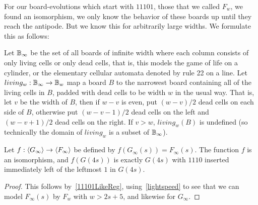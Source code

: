 \documentclass[12pt,letterpaper]{article}
\begin{document}
For our board-evolutions which start with $11101$, those that we called $F_w$, we found an isomorphism, we only know the behavior of these boards up until they reach the antipode. But we know this for arbitrarily large widths. We formulate this as follows:
\begin{dfn}\label{infiniteBoards}
  Let $\mathbb{B}_\infty$ be the set of all boards of infinite width where each column consists of only living cells or only dead cells, that is, this models the game of life on a cylinder, or the elementary cellular automata denoted by rule 22 on a line.
  Let $living_w: \mathbb{B}_\infty\rightarrow \mathbb{B}_w$ map a board $B$ to the narrowest board containing all of the living cells in $B$, padded with dead cells to be width $w$ in the usual way. That is, let $v$ be the width of $B$, then if $w-v$ is even, put $(w-v)/2$ dead cells on each side of $B$, otherwise put $(w-v-1)/2$ dead cells on the left and $(w-v+1)/2$ dead cells on the right. If $v>w$, $living_w(B)$ is undefined (so technically the domain of $living_w$ is a subset of $\mathbb{B}_\infty$). 
\end{dfn}


\begin{prop}\label{isom11101-1}
  Let $f:\langle G_\infty\rangle\rightarrow\langle F_\infty\rangle$ be defined by $f(G_\infty(s))=F_\infty(s)$. The function $f$ is an isomorphism, and $f(G(4s))$ is exactly $G(4s)$ with $1110$ inserted immediately left of the leftmost $1$ in $G(4s)$.
\end{prop}
\begin{proof}
  This follows by~\cref{11101LikeReg}, using~\cref{lightspeed} to see that we can model $F_\infty(s)$ by $F_{w}$ with $w>2s+5$, and likewise for $G_\infty$.
\end{proof}
\end{document}
